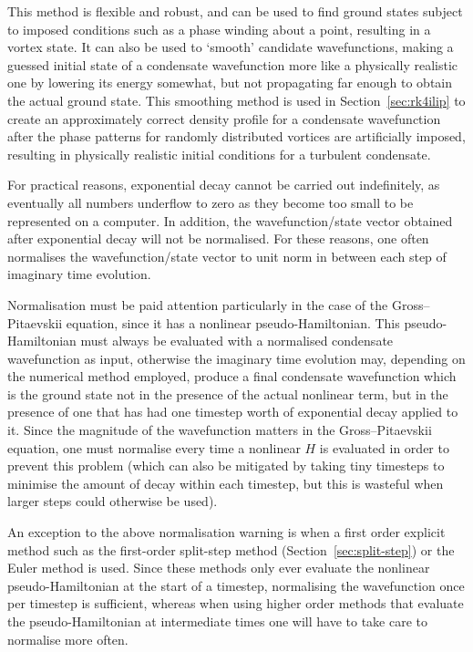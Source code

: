 This method is flexible and robust, and can be used to find ground states subject to imposed conditions such as a phase winding about a point, resulting in a vortex state. It can also be used to `smooth' candidate wavefunctions, making a guessed initial state of a condensate wavefunction more like a physically realistic one by lowering its energy somewhat, but not propagating far enough to obtain the actual ground state. This smoothing method is used in Section~\ref{sec:rk4ilip} to create an approximately correct density profile for a condensate wavefunction after the phase patterns for randomly distributed vortices are artificially imposed, resulting in physically realistic initial conditions for a turbulent condensate.  

For practical reasons, exponential decay cannot be carried out indefinitely, as eventually all numbers underflow to zero as they become too small to be represented on a computer. In addition, the wavefunction/state vector obtained after exponential decay will not be normalised. For these reasons, one often normalises the wavefunction/state vector to unit norm in between each step of imaginary time evolution.

Normalisation must be paid attention particularly in the case of the Gross--Pitaevskii equation, since it has a nonlinear pseudo-Hamiltonian. This pseudo-Hamiltonian must always be evaluated with a normalised condensate wavefunction as input, otherwise the imaginary time evolution may, depending on the numerical method employed, produce a final condensate wavefunction which is the ground state not in the presence of the actual nonlinear term, but in the presence of one that has had one timestep worth of exponential decay applied to it. Since the magnitude of the wavefunction matters in the Gross--Pitaevskii equation, one must normalise every time a nonlinear $H$ is evaluated in order to prevent this problem (which can also be mitigated by taking tiny timesteps to minimise the amount of decay within each timestep, but this is wasteful when larger steps could otherwise be used).

An exception to the above normalisation warning is when a first order explicit method such as the first-order split-step method (Section~\ref{sec:split-step}) or the Euler method is used. Since these methods only ever evaluate the nonlinear pseudo-Hamiltonian at the start of a timestep, normalising the wavefunction once per timestep is sufficient, whereas when using higher order methods that evaluate the pseudo-Hamiltonian at intermediate times one will have to take care to normalise more often.


